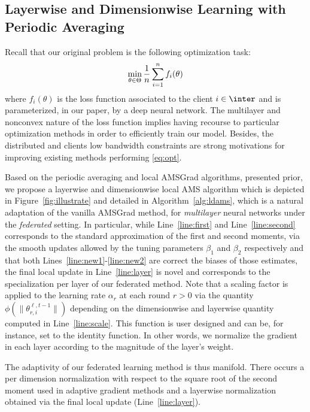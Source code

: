 \documentclass{article}
\begin{document}
\subsection{Layerwise and Dimensionwise Learning with Periodic Averaging}

Recall that our original problem is the following optimization task:
\begin{equation}\notag
\min \limits_{\theta \in \Theta} \frac{1}{n} \sum_{i=1}^n f_i(\theta)
\end{equation}
where $f_i(\theta)$ is the loss function associated to the client $i \in \inter$ and is parameterized, in our paper, by a deep neural network.
The multilayer and nonconvex nature of the loss function implies having recourse to particular optimization methods in order to efficiently train our model.
Besides, the distributed and clients low bandwidth constraints are strong motivations for improving existing methods performing \eqref{eq:opt}.  


Based on the periodic averaging and local AMSGrad algorithms, presented prior, we propose a layerwise and dimensionwise local AMS algorithm which is depicted in Figure~\ref{fig:illustrate} and detailed in Algorithm~\ref{alg:ldams}, which is a natural adaptation of the vanilla AMSGrad method, for \emph{multilayer} neural networks under the \emph{federated} setting.
In particular, while Line~\ref{line:first} and Line~\ref{line:second} corresponds to the standard approximation of the first and second moments, via the smooth updates allowed by the tuning parameters $\beta_1$ and $\beta_2$ respectively and that both Lines~\ref{line:new1}-\ref{line:new2} are correct the biases of those estimates, the final local update in Line~\ref{line:layer} is novel and corresponds to the specialization per layer of our federated method.
Note that a scaling factor is applied to the learning rate $\alpha_r$ at each round $r>0$ via the quantity $\phi(\|\theta_{r,i}^{\ell,t-1}\|)$ depending on the dimensionwise and layerwise quantity computed in Line~\ref{line:scale}.
This function is user designed and can be, for instance, set to the identity function. 
In other words, we normalize the gradient in each layer according to the magnitude of the layer's weight.

The adaptivity of our federated learning method is thus manifold. 
There occurs a per dimension normalization with respect to the square root of the second moment used in adaptive gradient methods and a layerwise normalization obtained via the final local update (Line~\ref{line:layer}).
\end{document}
